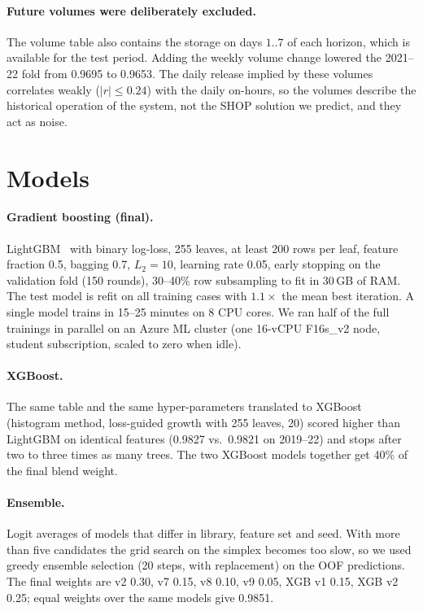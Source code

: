 \documentclass[11pt,a4paper]{article}
\newcommand{\code}[1]{\texttt{\detokenize{#1}}}
\begin{document}
\paragraph{Future volumes were deliberately excluded.} The volume table also contains the storage on days
$1..7$ of each horizon, which is available for the test period. Adding the weekly volume change lowered the
2021--22 fold from 0.9695 to 0.9653. The daily release implied by these volumes correlates weakly
($|r|\le0.24$) with the daily on-hours, so the volumes describe the historical operation of the system, not
the SHOP solution we predict, and they act as noise.

\section{Models}
\paragraph{Gradient boosting (final).} LightGBM~\cite{lightgbm} with binary log-loss, 255 leaves, at least 200
rows per leaf, feature fraction 0.5, bagging 0.7, $L_2=10$, learning rate 0.05, early stopping on the
validation fold (150 rounds), 30--40\% row subsampling to fit in 30\,GB of RAM. The test model is refit on all
training cases with $1.1\times$ the mean best iteration. A single model trains in 15--25 minutes on 8 CPU cores.
We ran half of the full trainings in parallel on an Azure ML cluster (one 16-vCPU F16s\_v2 node, student
subscription, scaled to zero when idle).

\paragraph{XGBoost.} The same table and the same hyper-parameters translated to XGBoost~\cite{xgboost}
(histogram method, loss-guided growth with 255 leaves, \code{min_child_weight} 20) scored higher than
LightGBM on identical features (0.9827 vs.\ 0.9821 on 2019--22) and stops after two to three times as many
trees. The two XGBoost models together get 40\% of the final blend weight.

\paragraph{Ensemble.} Logit averages of models that differ in library, feature set and seed. With more than
five candidates the grid search on the simplex becomes too slow, so we used greedy ensemble selection
(20 steps, with replacement) on the OOF predictions. The final weights are
v2 0.30, v7 0.15, v8 0.10, v9 0.05, XGB v1 0.15, XGB v2 0.25; equal weights over the same models give 0.9851.
\end{document}
